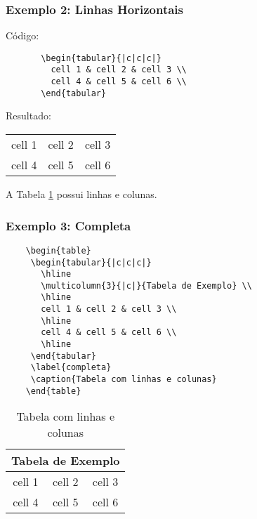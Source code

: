 
\begin{frame}[fragile]
  \frametitle{Exemplo 2: Linhas Horizontais}
  Código:
  \begin{center}

     \begin{verbatim}
       \begin{tabular}{|c|c|c|}
         cell 1 & cell 2 & cell 3 \\
         cell 4 & cell 5 & cell 6 \\
       \end{tabular}
     \end{verbatim}

  \end{center}

  Resultado:
  \begin{center}
     \begin{tabular}{|c|c|c|}
       cell 1 & cell 2 & cell 3 \\
       cell 4 & cell 5 & cell 6 \\
     \end{tabular}
  \end{center}

  A Tabela \ref{completa} possui linhas e colunas.

\end{frame}


\begin{frame}[fragile]
  \frametitle{Exemplo 3: Completa}

  \begin{verbatim}
    \begin{table}
     \begin{tabular}{|c|c|c|}
       \hline
       \multicolumn{3}{|c|}{Tabela de Exemplo} \\
       \hline
       cell 1 & cell 2 & cell 3 \\
       \hline
       cell 4 & cell 5 & cell 6 \\
       \hline
     \end{tabular}
     \label{completa}
     \caption{Tabela com linhas e colunas}
    \end{table}
  \end{verbatim}
  \vspace{1cm}
  \begin{flushright}
    \begin{table}
     \begin{tabular}{|c|c|c|}
       \hline
       \multicolumn{3}{|c|}{Tabela de Exemplo} \\
       \hline
       cell 1 & cell 2 & cell 3 \\
       \hline
       cell 4 & cell 5 & cell 6 \\
       \hline
     \end{tabular}
     \label{completa}
     \caption{Tabela com linhas e colunas}
    \end{table}
  \end{flushright}

\end{frame}
